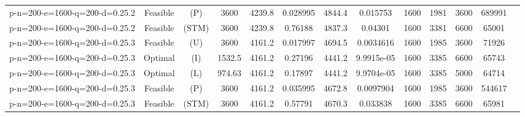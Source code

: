 \documentclass[landscape, a4paper]{article}
\newcommand{\STM}{\ensuremath{\mathrm{STM}}}
\newcommand{\Improved}{\ensuremath{\mathrm{I}}}
\newcommand{\Loose}{\ensuremath{\mathrm{L}}}
\newcommand{\Profit}{\ensuremath{\mathrm{P}}}
\newcommand{\Utility}{\ensuremath{\mathrm{U}}}
\begin{document}
\begin{center}
\begin{tabular}{lcccccccccccc}
p-n=200-e=1600-q=200-d=0.25.2 & Feasible & (\Profit) & 3600 & 4239.8 & 0.028995 & 4844.4 & 0.015753 & 1600 & 1981 & 3600 & 689991 & \\
p-n=200-e=1600-q=200-d=0.25.2 & Feasible & (\STM) & 3600 & 4239.8 & 0.76188 & 4837.3 & 0.04301 & 1600 & 3381 & 6600 & 65001 & \\
p-n=200-e=1600-q=200-d=0.25.3 & Feasible & (\Utility) & 3600 & 4161.2 & 0.017997 & 4694.5 & 0.0034616 & 1600 & 1985 & 3600 & 71926 & \\
p-n=200-e=1600-q=200-d=0.25.3 & Optimal & (\Improved) & 1532.5 & 4161.2 & 0.27196 & 4441.2 & 9.9915e-05 & 1600 & 3385 & 6600 & 65743 & \\
p-n=200-e=1600-q=200-d=0.25.3 & Optimal & (\Loose) & 974.63 & 4161.2 & 0.17897 & 4441.2 & 9.9704e-05 & 1600 & 3385 & 5000 & 64714 & \\
p-n=200-e=1600-q=200-d=0.25.3 & Feasible & (\Profit) & 3600 & 4161.2 & 0.035995 & 4672.8 & 0.0097904 & 1600 & 1985 & 3600 & 544617 & \\
p-n=200-e=1600-q=200-d=0.25.3 & Feasible & (\STM) & 3600 & 4161.2 & 0.57791 & 4670.3 & 0.033838 & 1600 & 3385 & 6600 & 65981 & \\
\end{tabular}
\end{center}
\end{document}
